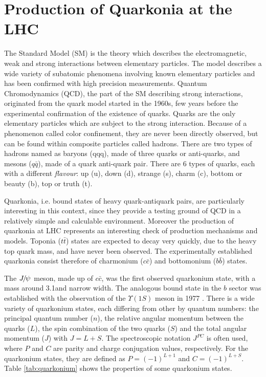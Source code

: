 \chapter{Production of Quarkonia at the LHC}
\label{sec:review}
The Standard Model (SM) is the theory which describes the electromagnetic, weak
and strong interactions between elementary particles. The model describes a
wide variety of subatomic phenomena involving known elementary particles and
has been confirmed with high precision measurements. Quantum Chromodynamics 
(QCD), the part of the SM describing strong interactions, originated from 
the quark model started in the 1960s\cite{GellMann:1964nj,Zweig:1981pd}, few
years before the experimental confirmation of the existence of quarks. Quarks are 
the only elementary particles which are subject to the strong interaction. 
Because of a phenomenon called color confinement, they are
never been directly observed,  but can be found within composite particles
called hadrons. There are two types of hadrons named as baryons (qqq), made of
three quarks or anti-quarks, and mesons ($q\bar{q}$), made of a quark 
anti-quark pair. There are 6 types of quarks, each with a different {\em{flavour}}: 
up (u), down (d), strange (s), charm (c), bottom or beauty (b), top or
truth (t).

Quarkonia, i.e. bound states of heavy quark-antiquark pairs, are particularly
interesting in this context, since they provide a testing ground of QCD in a
relatively simple and calculable environment. Moreover the production of
quarkonia at LHC represents an interesting check of production mechanisms and
models. Toponia ($t\bar{t}$) states are expected to decay very quickly, due to
the heavy top quark mass, and have never been observed. The experimentally
established quarkonia consist therefore of charmonium ($c\bar{c}$) and
bottomonium ($b\bar{b}$) states.

The ${{J\mskip -3mu/\mskip -2mu\psi\mskip 2mu}}$ meson, made up of $c\bar{c}$, was the first observed quarkonium
state\cite{PhysRevLett.33.1404}, with a mass around 3.1\gevcc and narrow width.
The analogous bound state in the $b$ sector was established with the
observation of the $\Upsilon(1S)$ meson in 1977 \cite{Herb:1977ek}. There is a
wide variety of quarkonium states, each differing from other by quantum
numbers: the principal quantum number ($n$), the relative angular momentum
between the quarks ($L$), the spin combination of the two quarks ($S$) and the
total angular momentum ($J$) with $J = L + S$. The spectroscopic notation
$J^{PC}$ is often used, where $P$ and $C$ are parity and
charge conjugation values, respectively. For the quarkonium states, they are
defined as $P=(-1)^{L+1}$ and $C=(-1)^{L+S}$. Table \ref{tab:quarkonium} shows
the properties of some quarkonium states.

